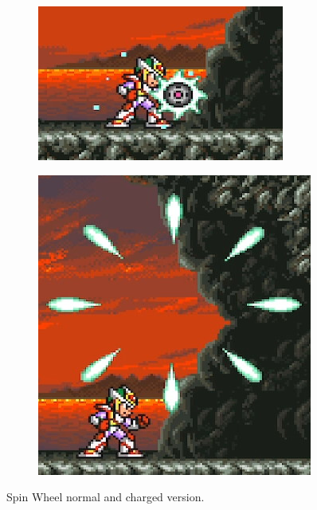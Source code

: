 \begin{figure}[htp]
	\centering
	\begin{subfigure}{0.4\linewidth}
		\includegraphics[width=\linewidth]{figures/X2/weapons/S_wheel_1.png}	
	\end{subfigure}
	\begin{subfigure}{0.3\linewidth}
		\centering
		\includegraphics[width=\linewidth]{figures/X2/weapons/S_wheel_2.png}	
	\end{subfigure}
\caption{Spin Wheel normal and charged version.}
\end{figure}

